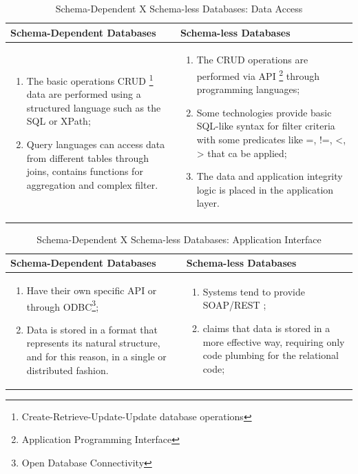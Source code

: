 \begin{table}
    \label{tab:ysi-data-distribution}
    \caption{Schema-Dependent X Schema-less Databases: Data Access}
    \begin{center}
    \begin{tabular}{|p{210pt}|p{210pt}|}\hline
    Schema-Dependent Databases & Schema-less Databases\\\hline
    \begin{enumerate}
      \item The basic operations CRUD \footnote{Create-Retrieve-Update-Update
      database operations} data are performed using a structured language such
      as the SQL or XPath;
      \item Query languages can access data from different tables through
      joins, contains functions for aggregation and complex filter.
    \end{enumerate} 
    & 
    \begin{enumerate}
      \item The CRUD operations are performed via API \footnote{Application
      Programming Interface} through programming languages;
      \item Some technologies provide basic SQL-like syntax for filter criteria
      with some predicates like =, !=, <, > that ca be applied;
      \item The data and application integrity logic is placed in the
      application layer.
    \end{enumerate}
    \\\hline
    \end{tabular}
    \end{center}
\end{table}

\begin{table}
    \label{tab:ysi-data-distribution}
    \caption{Schema-Dependent X Schema-less Databases: Application Interface}
    \begin{center}
    \begin{tabular}{|p{210pt}|p{210pt}|}\hline
    Schema-Dependent Databases & Schema-less Databases\\\hline
    \begin{enumerate}
      \item Have their own specific API or through ODBC\footnote{Open Database
      Connectivity};
      \item Data is stored in a format that represents its natural structure,
      and for this reason, in a single or distributed fashion.
    \end{enumerate} 
    & 
    \begin{enumerate}
      \item Systems tend to provide SOAP/REST \cite{http-rest};
      \item \cite{db-is-rdbs-dommed} claims that data is stored in a more
      effective way, requiring only code plumbing for the relational code;
    \end{enumerate}
    \\\hline
    \end{tabular}
    \end{center}
\end{table}

